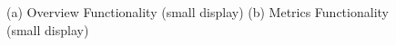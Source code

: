 \documentclass[11pt,a4paper,english]{scrreprt}
\begin{document}
\begin{figure}
    \centering
    \caption{(a) Overview Functionality (small display) (b) Metrics Functionality (small display)}
    \label{fig:samples_s_overview_metrics}
\end{figure}
\end{document}
